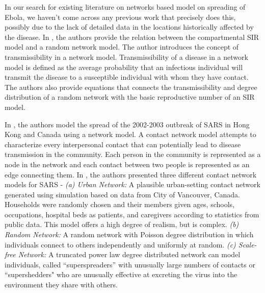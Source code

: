 \documentclass[10pt, journal,onecolumn]{IEEEtran}
\begin{document}
In our search for existing literature on networks based model on spreading of Ebola, we haven't come across any previous work that precisely does this, possibly due to the lack of detailed data in the locations historically affected by the disease.  In \citep{newman2002spread}, the authors provide the relation between the compartmental SIR model and a random network model. The author introduces the concept of transmissibility in a network model. Transmissibility of a disease in a network model is defined as the average probability that an infectious individual will transmit the disease to a susceptible individual with whom they have contact. The authors also provide equations that connects the transmissibility and degree distribution of a random network with the basic reproductive number of an SIR model.  

In \citep{meyers2005network}, the authors model the spread of the 2002-2003 outbreak of SARS in Hong Kong and Canada using a network model. A contact network model attempts to characterize every interpersonal contact that can potentially lead to disease transmission in the
community. Each person in the community is represented as a node in the network and each contact between
two people is represented as an edge connecting them.
In \citep{meyers2005network}, the authors presented three different contact network models for SARS -  \textit{(a) Urban Network:} A plausible urban-setting contact network generated using simulation based on data from City of Vancouver, Canada. Households were randomly chosen and  their members given ages, schools, occupations, hospital beds as patients, and  caregivers according to statistics from public data.  This model offers a high degree of realism, but is complex. \textit{(b) Random Network:} A random network with Poisson degree distribution in which individuals connect to others independently and uniformly at random. \textit{(c) Scale-free Network:}  A truncated power law degree distributed network can model individuals, called ``superspreaders'' with unusually large numbers of contacts or ``supershedders" who are unusually effective at
  excreting the virus into the environment they share with others. 
  
\end{document}

